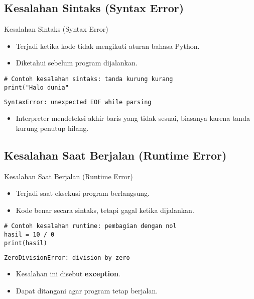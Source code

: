 \documentclass[aspectratio=169, table]{beamer}
\begin{document}
\subsection*{Kesalahan Sintaks (Syntax Error)}
\begin{frame}[fragile]{Kesalahan Sintaks (Syntax Error)}
\vspace*{20pt}
\begin{itemize}
  \item Terjadi ketika kode tidak mengikuti aturan bahasa Python.
  \item Diketahui sebelum program dijalankan.
\end{itemize}

\begin{lstlisting}[style=PythonStyle]
# Contoh kesalahan sintaks: tanda kurung kurang
print("Halo dunia"
\end{lstlisting}

\begin{lstlisting}[language=bash]
SyntaxError: unexpected EOF while parsing
\end{lstlisting}

\begin{itemize}
  \item Interpreter mendeteksi akhir baris yang tidak sesuai,
  biasanya karena tanda kurung penutup hilang.
\end{itemize}
\end{frame}

\subsection*{Kesalahan Saat Berjalan (Runtime Error)}
\begin{frame}[fragile]{Kesalahan Saat Berjalan (Runtime Error)}
\vspace*{20pt}
\begin{itemize}
  \item Terjadi saat eksekusi program berlangsung.
  \item Kode benar secara sintaks, tetapi gagal ketika dijalankan.
\end{itemize}

\begin{lstlisting}[style=PythonStyle]
# Contoh kesalahan runtime: pembagian dengan nol
hasil = 10 / 0
print(hasil)
\end{lstlisting}

\begin{lstlisting}[language=bash]
ZeroDivisionError: division by zero
\end{lstlisting}

\begin{itemize}
  \item Kesalahan ini disebut \textbf{exception}.
  \item Dapat ditangani agar program tetap berjalan.
\end{itemize}
\end{frame}
\end{document}
